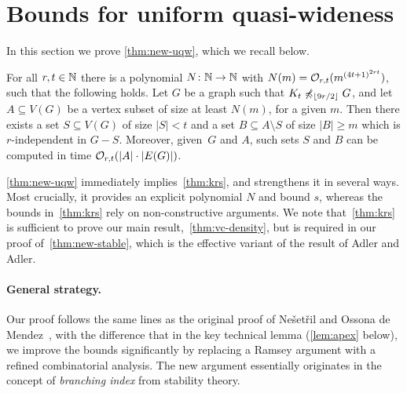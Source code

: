 \section{Bounds for uniform quasi-wideness}\label{sec:uqw}



In this section we prove \cref{thm:new-uqw},
which we recall below.
\setcounter{aux}{\thetheorem}
\setcounter{theorem}{\theuqw}
\begin{theorem}\label{thm:new-uqw}
For all $r,t\in \mathbb{N}$ there is a polynomial  $N\colon \mathbb{N}\to \mathbb{N}$ with $N(m)=
\mathcal{O}_{r,t}{(m^{{(4t+1)}^{2rt}})}$, such that the following holds.
Let $G$ be a graph such that $K_t\not\preccurlyeq_{\lfloor 9r/2\rfloor} G$, and
let $A\subseteq V(G)$ be a vertex subset of size at least $N(m)$, for a given $m$.
Then there exists a set $S\subseteq V(G)$ of size $|S|<t$ and a set $B\subseteq A\setminus S$ 
of size $|B|\geq m$ which is $r$-independent in $G-S$.
Moreover, given~$G$ and $A$, such sets $S$ and $B$ can be computed in time $\mathcal{O}_{r,t}(|A|\cdot |E(G)|)$. 
\end{theorem}
\setcounter{theorem}{\theaux}
\noindent\cref{thm:new-uqw} immediately implies~\cref{thm:krs},
and strengthens it in several ways. Most crucially, 
it provides an explicit polynomial $N$ and bound $s$,
whereas the bounds in~\cref{thm:krs} rely on non-constructive arguments. We note that~\cref{thm:krs} is sufficient to prove our main result,~\cref{thm:vc-density}, but is required in our proof of~\cref{thm:new-stable}, which is the effective 
variant of the result of Adler and Adler.




%



\paragraph{General strategy.}
Our proof follows the same lines as the original proof of Ne\v set\v ril and Ossona de Mendez~\cite{nevsetvril2011nowhere}, with the difference that in the key technical lemma (\cref{lem:apex} below), 
we improve the bounds significantly by replacing a Ramsey argument with a refined combinatorial analysis.
The new argument essentially originates in the concept of {\em{branching index}} from stability theory. 

